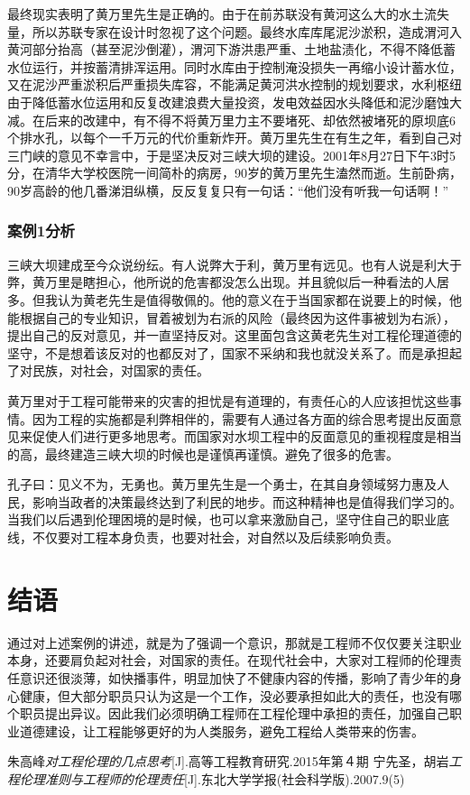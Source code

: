 \documentclass[a4paper,12pt]{ctexart}
\begin{document}
最终现实表明了黄万里先生是正确的。由于在前苏联没有黄河这么大的水土流失量，所以苏联专家在设计时忽视了这个问题。最终水库库尾泥沙淤积，造成渭河入黄河部分抬高（甚至泥沙倒灌），渭河下游洪患严重、土地盐渍化，不得不降低蓄水位运行，并按蓄清排浑运用。同时水库由于控制淹没损失一再缩小设计蓄水位，又在泥沙严重淤积后严重损失库容，不能满足黄河洪水控制的规划要求，水利枢纽由于降低蓄水位运用和反复改建浪费大量投资，发电效益因水头降低和泥沙磨蚀大减。在后来的改建中，有不得不将黄万里力主不要堵死、却依然被堵死的原坝底6个排水孔，以每个一千万元的代价重新炸开。黄万里先生在有生之年，看到自己对三门峡的意见不幸言中，于是坚决反对三峡大坝的建设。2001年8月27日下午3时5分，在清华大学校医院一间简朴的病房，90岁的黄万里先生溘然而逝。生前卧病，90岁高龄的他几番涕泪纵横，反反复复只有一句话：“他们没有听我一句话啊！”

\subsubsection{案例1分析}
三峡大坝建成至今众说纷纭。有人说弊大于利，黄万里有远见。也有人说是利大于弊，黄万里是瞎担心，他所说的危害都没怎么出现。并且貌似后一种看法的人居多。但我认为黄老先生是值得敬佩的。他的意义在于当国家都在说要上的时候，他能根据自己的专业知识，冒着被划为右派的风险（最终因为这件事被划为右派），提出自己的反对意见，并一直坚持反对。这里面包含这黄老先生对工程伦理道德的坚守，不是想着该反对的也都反对了，国家不采纳和我也就没关系了。而是承担起了对民族，对社会，对国家的责任。

黄万里对于工程可能带来的灾害的担忧是有道理的，有责任心的人应该担忧这些事情。因为工程的实施都是利弊相伴的，需要有人通过各方面的综合思考提出反面意见来促使人们进行更多地思考。而国家对水坝工程中的反面意见的重视程度是相当的高，最终建造三峡大坝的时候也是谨慎再谨慎。避免了很多的危害。

孔子曰：见义不为，无勇也。黄万里先生是一个勇士，在其自身领域努力惠及人民，影响当政者的决策最终达到了利民的地步。而这种精神也是值得我们学习的。当我们以后遇到伦理困境的是时候，也可以拿来激励自己，坚守住自己的职业底线，不仅要对工程本身负责，也要对社会，对自然以及后续影响负责。



\section{结语}

通过对上述案例的讲述，就是为了强调一个意识，那就是工程师不仅仅要关注职业本身，还要肩负起对社会，对国家的责任。在现代社会中，大家对工程师的伦理责任意识还很淡薄，如快播事件，明显加快了不健康内容的传播，影响了青少年的身心健康，但大部分职员只认为这是一个工作，没必要承担如此大的责任，也没有哪个职员提出异议。因此我们必须明确工程师在工程伦理中承担的责任，加强自己职业道德建设，让工程能够更好的为人类服务，避免工程给人类带来的伤害。

\begin{thebibliography}{99}

朱高峰\emph{对工程伦理的几点思考}[J].高等工程教育研究.2015年第４期
  宁先圣，胡岩\emph{工程伦理准则与工程师的伦理责任}[J].东北大学学报(社会科学版).2007.9(5)
  
\end{thebibliography}
\end{document}
